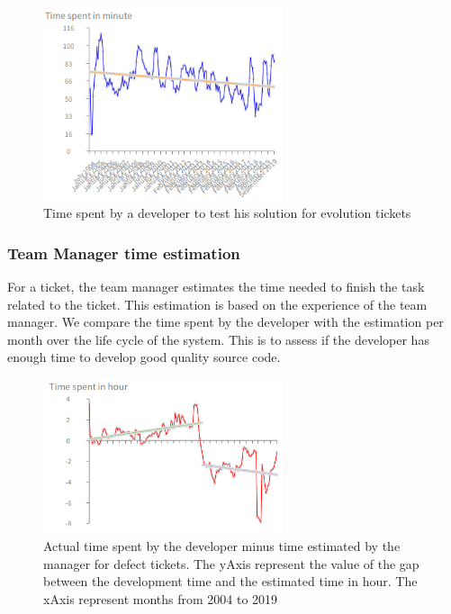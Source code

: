 \documentclass[10pt,conference]{IEEEtran}
\begin{document}
\begin{figure}[H]
  \centering
  \includegraphics[width=70mm]{./images/evolutionTest.png}
  \caption{Time spent by a developer to test his solution for  evolution tickets}
  \label{fig:devTimeTestEvol}
\end{figure}

 \subsubsection{Team Manager time estimation}

For a ticket, the team manager estimates the time needed to finish the task related to the ticket.
This estimation is based on the experience of the team manager.  
We compare the time spent by the developer with the estimation per month over the life cycle of the system.  
This is to assess if the developer has enough time to develop good quality source code.

\begin{figure}[H]
  \centering
  \includegraphics[width=70mm]{./images/estimateBug.png}
  \caption{Actual time spent by the developer minus time estimated by the manager for defect tickets.  The yAxis represent the value of the gap between the development time and the estimated time in hour. The xAxis represent months from 2004 to 2019}
  \label{fig:devEstDefect}
\end{figure}
\end{document}
